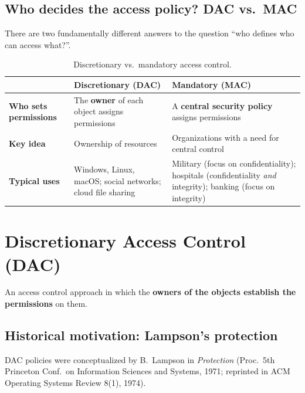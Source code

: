 \subsection{Who decides the access policy? DAC vs.\ MAC}

There are two fundamentally different answers to the question ``who defines who can access what?''.

\begin{table}[h]
\centering
\begin{tabular}{@{}p{3cm}p{5.2cm}p{5.2cm}@{}}
\toprule
 & \textbf{Discretionary (DAC)} & \textbf{Mandatory (MAC)} \\
\midrule
\textbf{Who sets permissions} & The \textbf{owner} of each object assigns permissions & A \textbf{central security policy} assigns permissions \\[4pt]
\textbf{Key idea} & Ownership of resources & Organizations with a need for central control \\[4pt]
\textbf{Typical uses} & Windows, Linux, macOS; social networks; cloud file sharing &
Military (focus on confidentiality); hospitals (confidentiality \emph{and} integrity); banking (focus on integrity) \\
\bottomrule
\end{tabular}
\caption{Discretionary vs.\ mandatory access control.}
\end{table}

\section{Discretionary Access Control (DAC)}

\begin{definition}
An access control approach in which the \textbf{owners of the objects establish the permissions} on them.
\end{definition}

\subsection{Historical motivation: Lampson's protection}

DAC policies were conceptualized by B.\ Lampson in \emph{Protection} (Proc.\ 5th Princeton Conf.\ on Information Sciences and Systems, 1971; reprinted in ACM Operating Systems Review 8(1), 1974).

